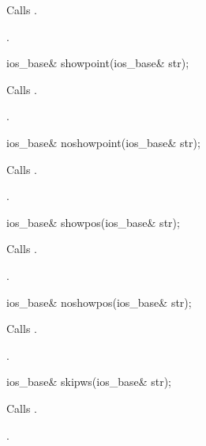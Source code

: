 \begin{itemdescr}
\pnum
\effects
Calls
.

\pnum
\returns
{}.
\end{itemdescr}

%
\begin{itemdecl}
ios_base& showpoint(ios_base& str);
\end{itemdecl}

\begin{itemdescr}
\pnum
\effects
Calls
.

\pnum
\returns
{}.
\end{itemdescr}

%
\begin{itemdecl}
ios_base& noshowpoint(ios_base& str);
\end{itemdecl}

\begin{itemdescr}
\pnum
\effects
Calls
.

\pnum
\returns
{}.
\end{itemdescr}

%
\begin{itemdecl}
ios_base& showpos(ios_base& str);
\end{itemdecl}

\begin{itemdescr}
\pnum
\effects
Calls
.

\pnum
\returns
{}.
\end{itemdescr}

%
\begin{itemdecl}
ios_base& noshowpos(ios_base& str);
\end{itemdecl}

\begin{itemdescr}
\pnum
\effects
Calls
.

\pnum
\returns
{}.
\end{itemdescr}

%
\begin{itemdecl}
ios_base& skipws(ios_base& str);
\end{itemdecl}

\begin{itemdescr}
\pnum
\effects
Calls
.

\pnum
\returns
{}.
\end{itemdescr}

